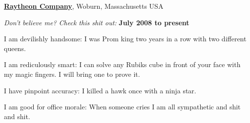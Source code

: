 \documentclass[8pt]{article}
\newenvironment{outerlist}[1][\enskip\textbullet]%
        {\begin{enumerate}[#1]}{\end{enumerate}%
         \vspace{-.3\baselineskip}}
\newenvironment{innerlist}[1][\enskip\textbullet]%
        {\begin{compactenum}[#1]}{\end{compactenum}}
\def\CC{{C\nolinebreak[4]\hspace{-.05em}\raisebox{.4ex}{\tiny\bf ++}}}
\begin{document}
\href{http://www.raytheon.com/}{\textbf{Raytheon Company}}, 
Woburn, Massachusetts USA
\begin{outerlist}

\item[] \textit{Don't believe me? Check this shit out:}%
        \hfill \textbf{July 2008 to present}
\begin{innerlist}
\item I am devilishly handsome: I was Prom king two years in a row with two different queens.
\item I am rediculously smart: I can solve any Rubiks cube in front of your face with my magic fingers. I will bring one to prove it.
\item I have pinpoint accuracy: I killed a hawk once with a ninja star.
\item I am good for office morale: When someone cries I am all sympathetic and shit and shit.
\end{innerlist}
\end{outerlist}
\end{document}
